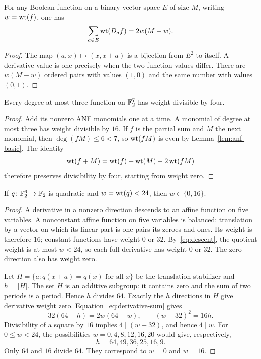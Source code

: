 \begin{lemma}\label{lem:derivative-sum}
For any Boolean function on a binary vector space $E$ of size $M$, writing $w=\operatorname{wt}(f)$, one has
\begin{equation}\label{eq:derivative-sum}
\sum_{a\in E}\operatorname{wt}(D_a f)=2w(M-w).
\end{equation}
\end{lemma}
\begin{proof}
The map $(a,x)\mapsto(x,x+a)$ is a bijection from $E^2$ to itself. A derivative value is one precisely when the two function values differ. There are $w(M-w)$ ordered pairs with values $(1,0)$ and the same number with values $(0,1)$.
\end{proof}

\begin{lemma}\label{lem:cubic-divisibility}
Every degree-at-most-three function on $\mathbb F_2^7$ has weight divisible by four.
\end{lemma}
\begin{proof}
Add its nonzero ANF monomials one at a time. A monomial of degree at most three has weight divisible by $16$. If $f$ is the partial sum and $M$ the next monomial, then $\deg(fM)\le6<7$, so $\operatorname{wt}(fM)$ is even by Lemma~\ref{lem:anf-basic}. The identity
\[
\operatorname{wt}(f+M)=\operatorname{wt}(f)+\operatorname{wt}(M)-2\operatorname{wt}(fM)
\]
therefore preserves divisibility by four, starting from weight zero.
\end{proof}

\begin{lemma}\label{lem:quadratic-six}
If $q\colon\mathbb F_2^6\to\mathbb F_2$ is quadratic and $w=\operatorname{wt}(q)<24$, then $w\in\{0,16\}$.
\end{lemma}
\begin{proof}
A derivative in a nonzero direction descends to an affine function on five variables. A nonconstant affine function on five variables is balanced: translation by a vector on which its linear part is one pairs its zeroes and ones. Its weight is therefore $16$; constant functions have weight $0$ or $32$. By~\eqref{eq:descent}, the quotient weight is at most $w<24$, so each full derivative has weight $0$ or $32$. The zero direction also has weight zero.

Let $H=\{a:q(x+a)=q(x)\text{ for all }x\}$ be the translation stabilizer and $h=|H|$. The set $H$ is an additive subgroup: it contains zero and the sum of two periods is a period. Hence $h$ divides $64$. Exactly the $h$ directions in $H$ give derivative weight zero. Equation~\eqref{eq:derivative-sum} gives
\[
32(64-h)=2w(64-w),\qquad (w-32)^2=16h.
\]
Divisibility of a square by $16$ implies $4\mid(w-32)$, and hence $4\mid w$. For $0\le w<24$, the possibilities $w=0,4,8,12,16,20$ would give, respectively,
\[
h=64,49,36,25,16,9.
\]
Only $64$ and $16$ divide $64$. They correspond to $w=0$ and $w=16$.
\end{proof}

